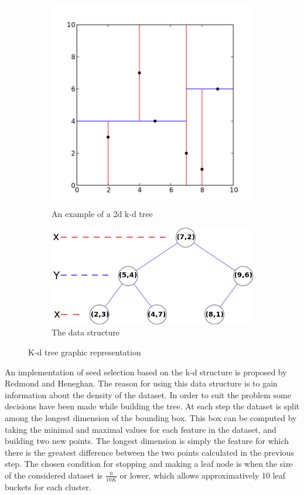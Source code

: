 \documentclass[12pt]{article}
\begin{document}
	\begin{figure}
		\centering
		\begin{subfigure}{.5\textwidth}
			\centering
			\includegraphics[width=.9\linewidth]{Kdtree_2d.png}
			\caption{An example of a 2d k-d tree\cite{KdTreeFig1}}
		\end{subfigure}%
		\begin{subfigure}{.5\textwidth}
			\centering
			\includegraphics[width=.9\linewidth]{Tree_0001.png}
			\caption{The data structure\cite{KdTreeFig2}}
		\end{subfigure}
		\caption{K-d tree graphic representation}
		\label{fig:kdtree}
	\end{figure}
	
	An implementation of seed selection based on the k-d structure is proposed by Redmond and Heneghan\cite{KdTreeKmeans}. The reason for using this data structure is to gain information about the density of the dataset. In order to suit the problem some decisions have been made while building the tree. At each step the dataset is split among the longest dimension of the bounding box. This box can be computed by taking the minimal and maximal values for each feature in the dataset, and building two new points. The longest dimension is simply the feature for which there is the greatest difference between the two points calculated in the previous step. The chosen condition for stopping and making a leaf node is when the size of the considered dataset is \(\frac{n}{10K}\) or lower, which allows approximatively 10 leaf buckets for each cluster.
	
\end{document}
